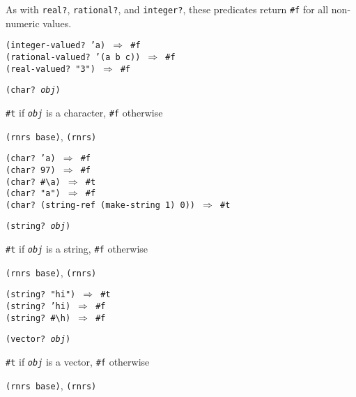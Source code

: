 As with \texttt{real?}, \texttt{rational?}, and \texttt{integer?}, these
predicates return \texttt{\#{}f} for all non-numeric values.


\begin{alltt}
(integer-valued? 'a) \(\Rightarrow\) \#{}f
(rational-valued? '(a b c)) \(\Rightarrow\) \#{}f
(real-valued? "3") \(\Rightarrow\) \#{}f
\end{alltt}

\begin{description}

\label{objects_s19}\item[procedure] \texttt{(char? \textit{obj})}



\item[returns] \texttt{\#{}t} if \texttt{\textit{obj}} is a character, \texttt{\#{}f} otherwise


\item[libraries] \texttt{(rnrs base)}, \texttt{(rnrs)}
\end{description}


\begin{alltt}
(char? 'a) \(\Rightarrow\) \#{}f
(char? 97) \(\Rightarrow\) \#{}f
(char? \#{}\textbackslash{}a) \(\Rightarrow\) \#{}t
(char? "a") \(\Rightarrow\) \#{}f
(char? (string-ref (make-string 1) 0)) \(\Rightarrow\) \#{}t
\end{alltt}

\begin{description}

\label{objects_s20}\item[procedure] \texttt{(string? \textit{obj})}



\item[returns] \texttt{\#{}t} if \texttt{\textit{obj}} is a string, \texttt{\#{}f} otherwise


\item[libraries] \texttt{(rnrs base)}, \texttt{(rnrs)}
\end{description}


\begin{alltt}
(string? "hi") \(\Rightarrow\) \#{}t
(string? 'hi) \(\Rightarrow\) \#{}f
(string? \#{}\textbackslash{}h) \(\Rightarrow\) \#{}f
\end{alltt}

\begin{description}

\label{objects_s21}\item[procedure] \texttt{(vector? \textit{obj})}



\item[returns] \texttt{\#{}t} if \texttt{\textit{obj}} is a vector, \texttt{\#{}f} otherwise


\item[libraries] \texttt{(rnrs base)}, \texttt{(rnrs)}
\end{description}


